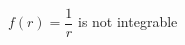 \documentclass[preview]{standalone}
\begin{document}
\begin{center}
$f(r) = \dfrac{1}{r}$ is not integrable
\end{center}
\end{document}
